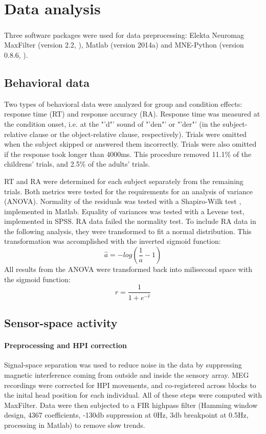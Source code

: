 \section{Data analysis}

Three software packages were used for data preprocessing: Elekta Neuromag\textsuperscript{\textregistered} MaxFilter (version 2.2, \cite{3.3.MNE}), Matlab (version 2014a) and MNE-Python (version 0.8.6, \cite{3.3.MNEpython}).

\subsection{Behavioral data}

Two types of behavioral data were analyzed for group and condition effects: response time (RT) and response accuracy (RA).
Response time was measured at the condition onset, i.e. at the "'d"' sound of "'den"' or "'der"' (in the subject-relative clause or the object-relative clause, respectively).
Trials were omitted when the subject skipped or answered them incorrectly.
Trials were also omitted if the response took longer than 4000ms.
This procedure removed 11.1\% of the childrens' trials, and 2.5\% of the adults' trials.

RT and RA were determined for each subject separately from the remaining trials.
Both metrics were tested for the requirements for an analysis of variance (ANOVA).
Normality of the residuals was tested with a Shapiro-Wilk test \cite{3.3.swtest}, implemented in Matlab.
Equality of variances was tested with a Levene test\cite{3.3.levtest}, implemented in SPSS.
RA data failed the normality test.
To include RA data in the following analysis, they were transformed to fit a normal distribution.
This transformation was accomplished with the inverted sigmoid function:
\[ \hat{a} = - log( \frac{1}{a} - 1 ) \]
All results from the ANOVA were transformed back into milisecond space with the sigmoid function:
\[ r = \frac{1}{1+e^{-\hat{r}}} \]

\subsection{Sensor-space activity}

\paragraph{Preprocessing and HPI correction}
Signal-space separation \cite{3.3.SSS} was used to reduce noise in the data by suppressing magnetic interference coming from outside and inside the sensory array.
MEG recordings were corrected for HPI movements, and co-registered across blocks to the inital head position for each individual.
All of these steps were computed with MaxFilter.
Data were then subjected to a FIR highpass filter (Hamming window design, 4367 coefficients, -130db suppression at 0Hz, 3db breakpoint at 0.5Hz, processing in Matlab) to remove slow trends.

